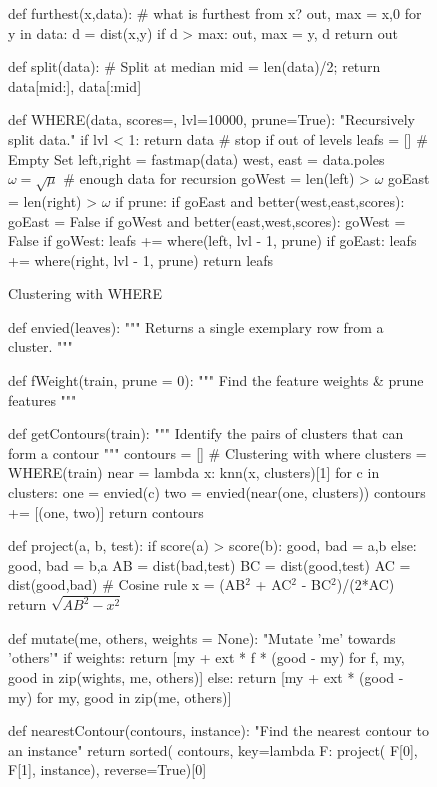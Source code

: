 \documentclass[conference]{IEEEtran}
\begin{document}
{\begin{figure}[!b]
\begin{python}[left]
def furthest(x,data): 
  # what is furthest from x?
  out, max = x,0
  for y in data:
    d = dist(x,y)
    if d > max: out, max = y, d
  return out

def split(data): # Split at median
   mid = len(data)/2; 
  return data[mid:], data[:mid]

def WHERE(data, scores={}, 
          lvl=10000, prune=True):  
  "Recursively split data."
  if lvl < 1: 
     return data # stop if out of levels
  leafs      = [] # Empty Set
  left,right = fastmap(data)
  west, east = data.poles
  $\omega=\sqrt{\mu}$ # enough data for recursion
  goWest = len(left) > $\omega$  
  goEast = len(right) > $\omega$ 
  if prune: 
    if goEast and better(west,east,scores): 
       goEast = False 
    if goWest and better(east,west,scores): 
       goWest = False 
  if goWest:  
     leafs += where(left,  lvl - 1, prune)  
  if goEast:  
     leafs += where(right, lvl - 1, prune) 
  return leafs

\end{python}
\caption{Clustering with WHERE}
\label{fig:fastmapCode}   
\end{figure}


\begin{figure}[!t]
\begin{python}[right]
def envied(leaves):
  """
  Returns a single exemplary row from 
  a cluster.
  """

def fWeight(train, prune = 0):
  """
  Find the feature weights & prune features
  """

def getContours(train):
  """
  Identify the pairs of clusters
  that can form a contour
  """
  contours = []
  # Clustering with where
  clusters = WHERE(train) 
  near = lambda x: knn(x, clusters)[1]
  for c in clusters:
    one = envied(c)
    two = envied(near(one, clusters))
    contours += [(one, two)]
  return contours

def project(a, b, test):
  if score(a) > score(b):
    good, bad = a,b 
  else:
    good, bad = b,a
  AB = dist(bad,test)
  BC = dist(good,test)
  AC = dist(good,bad)
  # Cosine rule
  x = (AB$^2$ + AC$^2$ - BC$^2$)/(2*AC)
  return $\sqrt{AB^2 - x^2}$

def mutate(me, others, weights = None):
  "Mutate 'me' towards 'others'"
  if weights:
    return [my + ext * f * (good - my) for 
    f, my, good in zip(wights, me, others)]
  else:
    return [my + ext * (good - my) 
    	 for my, good in zip(me, others)]

def nearestContour(contours, instance):
  "Find the nearest contour to an instance"
  return sorted(
        contours,
        key=lambda F: project(
        F[0], F[1], instance), 
        reverse=True)[0]
        

\end{python}
\end{figure}}
\end{document}
